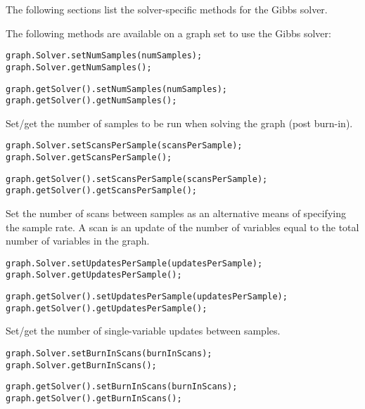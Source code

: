 The following sections list the solver-specific methods for the Gibbs solver.


The following methods are available on a graph set to use the Gibbs solver:

\ifmatlab
\begin{lstlisting}
graph.Solver.setNumSamples(numSamples);
graph.Solver.getNumSamples();
\end{lstlisting}
\fi

\ifjava
\begin{lstlisting}
graph.getSolver().setNumSamples(numSamples);
graph.getSolver().getNumSamples();
\end{lstlisting}
\fi

Set/get the number of samples to be run when solving the graph (post burn-in).

\ifmatlab
\begin{lstlisting}
graph.Solver.setScansPerSample(scansPerSample);
graph.Solver.getScansPerSample();
\end{lstlisting}
\fi

\ifjava
\begin{lstlisting}
graph.getSolver().setScansPerSample(scansPerSample);
graph.getSolver().getScansPerSample();
\end{lstlisting}
\fi

Set the number of scans between samples as an alternative means of specifying the sample rate. A scan is an update of the number of variables equal to the total number of variables in the graph.

\ifmatlab
\begin{lstlisting}
graph.Solver.setUpdatesPerSample(updatesPerSample);
graph.Solver.getUpdatesPerSample();
\end{lstlisting}
\fi

\ifjava
\begin{lstlisting}
graph.getSolver().setUpdatesPerSample(updatesPerSample);
graph.getSolver().getUpdatesPerSample();
\end{lstlisting}
\fi


Set/get the number of single-variable updates between samples.

\ifmatlab
\begin{lstlisting}
graph.Solver.setBurnInScans(burnInScans);
graph.Solver.getBurnInScans();
\end{lstlisting}
\fi

\ifjava
\begin{lstlisting}
graph.getSolver().setBurnInScans(burnInScans);
graph.getSolver().getBurnInScans();
\end{lstlisting}
\fi

